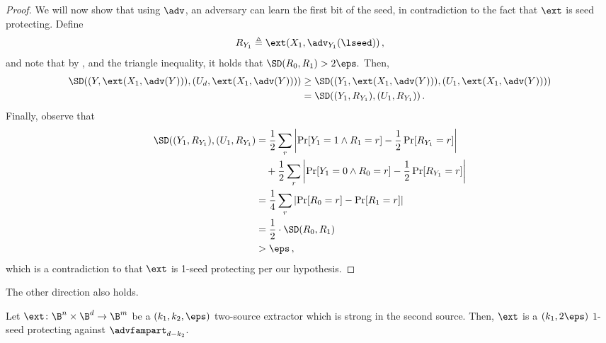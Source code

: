 \begin{proof}
We will now show that using $\adv$, an adversary can learn the first bit of the seed, in contradiction to the fact that $\ext$ is seed protecting.
Define \[R_{Y_1} \triangleq \ext(X_1,\adv_{Y_1}(\lseed))\,,\] and note that by ,  and the triangle inequality, it holds that 
$\SD(R_0,R_1) > 2\eps.$
Then,
\begin{align*}
\SD(( Y,\ext(X_1,\adv(Y))), (U_d,\ext(X_1,\adv(Y)))) &\geq
\SD(( Y_1,\ext(X_1,\adv(Y))), (U_1, \ext(X_1,\adv(Y)))) \\ 
&=\SD(( Y_1, R_{Y_1}), (U_1,R_{Y_1}))\,.
\end{align*}
%
%
%
Finally, observe that 
\begin{align*}
\SD(( Y_1, R_{Y_1}), (U_1,R_{Y_1}) &= \frac{1}{2}\sum_{r}\left| \Pr[Y_1 = 1 \wedge R_{1} = r] - \frac{1}{2}\Pr[R_{Y_1}=r] \right| \\
&~~~+ \frac{1}{2}\sum_{r}\left| \Pr[Y_1 = 0 \wedge R_{0} = r] - \frac{1}{2}\Pr[R_{Y_1}=r] \right| \\ 
&= \frac{1}{4}\sum_{r}\left| \Pr[R_0 = r] - \Pr[R_1=r] \right| \\ &= \frac{1}{2} \cdot \SD(R_0,R_1) \\ &> \eps\,,
\end{align*}
which is a contradiction to that $\ext$ is 1-seed protecting per our hypothesis.%



\end{proof}

The other direction also holds.

\begin{lemma}\label{lem:two-source}
Let $\ext \colon \B^n \times \B^d \rightarrow \B^m$ be a 
$(k_1,k_2,\eps)$ two-source extractor which is strong in the second source. Then, $\ext$ is a $(k_1,2\eps)$
$1$-seed protecting against $\advfampart_{d-k_2}$.
\end{lemma}

